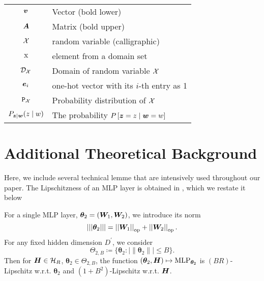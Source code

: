 \begin{table}[h]
\begin{tabular}{cl}
    \midrule
        $\bm{v}$ & Vector (bold lower) \\
        $\bm{A}$ & Matrix (bold upper) \\
        $\mathcal{X}$ & random variable (calligraphic) \\
        $\text{x}$ & element from a domain set \\
        $\mathcal{D}_{\mathcal{X}}$ & Domain of random variable $\mathcal{X}$ \\
        $\bm{e}_i$ & one-hot vector with its $i$-th entry as 1 \\
    \midrule
        $\mathtt{P}_{\mathcal{X}}$ & Probability distribution of $\mathcal{X}$ \\
        $P_{\bm{z} | \bm{w}}(z \mid w )$ & The probability $P \left[ \bm{z} = z \mid \bm{w} = w \right]$ \\
    \bottomrule
    \end{tabular}
     \label{tab:nomenclature}
\end{table}

\clearpage







\section{Additional Theoretical Background}\label{sec:additional-theory}
Here, we include several technical lemme that are intensively used throughout our paper.
The Lipschitzness of an MLP layer is obtained in \citep[Lemma~J.1]{bai2024transformers}, which we restate it below
\begin{lemma}\label{lem:mlp-lipschitz}
    For a single MLP layer, $\bm{\theta}_2 = (\bm{W}_1, \bm{W}_2)$, we introduce its norm
    \begin{equation*}
        \lvert
        \lvert
        \lvert
        \bm{\theta}_2
        \rvert 
        \rvert 
        \rvert
        =
        \left\lvert \left\lvert\bm{W}_1\right\rvert \right\rvert_{\text{op}}
        +
        \left\lvert \left\lvert\bm{W}_2\right\rvert \right\rvert_{\text{op}}.
    \end{equation*}
    For any fixed hidden dimension $D^\prime$, we consider
    \begin{equation*}
        \Theta_{2, B}
        \coloneqq
        \{ 
        \bm{\theta}_2
        :
        \lvert
        \lVert
        \bm{\theta}_2
        \rVert
        \rvert
        \leq 
        B
        \}.
    \end{equation*}
    Then for $\bm{H} \in \mathcal{H}_R$, $\bm{\theta}_2 \in \Theta_{2, B}$, the function 
    $(\bm{\theta}_2, \bm{H}) \mapsto \text{MLP}_{\bm{\theta}_2}$ is $(BR)$-Lipschitz w.r.t. $\bm{\theta}_2$
    and $(1 + B^2)$-Lipschitz w.r.t. $\bm{H}$.
\end{lemma}

